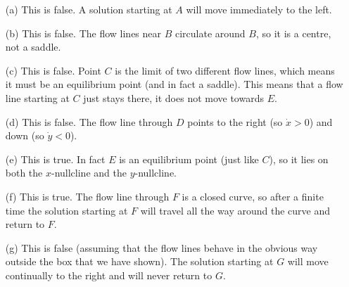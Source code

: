 \documentclass[a4paper]{amsart}
\begin{document}
\begin{solution}
 \begin{itemize}
  \item[(a)] This is false.  A solution starting at $A$ will move
   immediately to the left.
  \item[(b)] This is false.  The flow lines near $B$ circulate around
   $B$, so it is a centre, not a saddle.
  \item[(c)] This is false.  Point $C$ is the limit of two different
   flow lines, which means it must be an equilibrium point (and in
   fact a saddle).  This means that a flow line starting at $C$ just
   stays there, it does not move towards $E$.
  \item[(d)] This is false.  The flow line through $D$ points to the
   right (so $\dot{x}>0$) and down (so $\dot{y}<0$).
  \item[(e)] This is true.  In fact $E$ is an equilibrium point (just
   like $C$), so it lies on both the $x$-nullcline and the
   $y$-nullcline.
  \item[(f)] This is true.  The flow line through $F$ is a closed
   curve, so after a finite time the solution starting at $F$ will
   travel all the way around the curve and return to $F$.
  \item[(g)] This is false (assuming that the flow lines behave in the
   obvious way outside the box that we have shown).  The solution
   starting at $G$ will move continually to the right and will never
   return to $G$.
 \end{itemize}
\end{solution}
\end{document}
